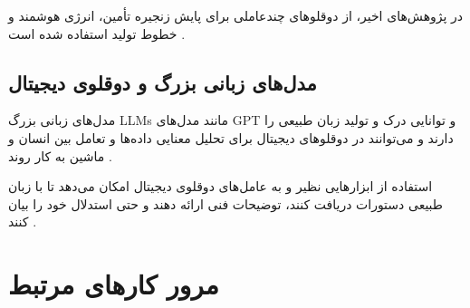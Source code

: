 \documentclass[a4paper,fleqn]{report}
\begin{document}

در پژوهش‌های اخیر، از دوقلوهای چندعاملی برای پایش زنجیره تأمین، انرژی هوشمند و خطوط تولید استفاده شده است \cite{liu2024ai}. 


\subsection{مدل‌های زبانی بزرگ و دوقلوی دیجیتال}

مدل‌های زبانی بزرگ 
\glspl{LLM}
 مانند مدل‌های 
 \gls{GPT}
 و 
  توانایی درک و تولید زبان طبیعی را دارند و می‌توانند در دوقلوهای دیجیتال برای تحلیل معنایی داده‌ها و تعامل بین انسان و ماشین به کار روند \cite{Pizon2026integrating,liu2025empoweringdt}. 



استفاده از ابزارهایی نظیر 
 و 
  به عامل‌های دوقلوی دیجیتال امکان می‌دهد تا با زبان طبیعی دستورات دریافت کنند، توضیحات فنی ارائه دهند و حتی استدلال خود را بیان کنند \cite{park2025interactive}.


\section{مرور کارهای مرتبط}
\end{document}
